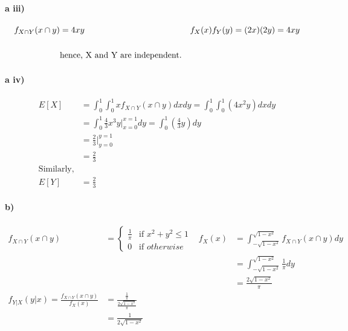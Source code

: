 \documentclass[letterpaper,12pt,titlepage,oneside,final]{book}
\begin{document}
\paragraph{a iii)}
\begin{align*}
f_{X\cap Y}(x\cap y)&=4xy &f_X(x)f_Y(y)=(2x)(2y)=4xy \\
\bigskip\\
&\text{hence, X and Y are independent.}
\end{align*}
\paragraph{a iv)}
\begin{align*}
E[X] &= \int_0^1 \int_{0}^{1}x f_{X \cap Y}(x\cap y)dxdy = \int_0^1 \int_{0}^{1}(4x^2y)dxdy\\
&= \int_0^1 \frac{4}{3} x^3y\rvert_{x=0}^{x=1}dy = \int_0^1 \left(\frac{4}{3}y\right)dy\\
&= \frac{2}{3}\rvert_{y=0}^{y=1}\\ 
&=\frac{2}{3}\\
\text{Similarly,}
\\E[Y] &=\frac{2}{3}
\end{align*}

\paragraph{b)}
\begin{align*}
f_{X\cap Y}(x\cap y)& = \begin{cases} \frac{1}{\pi} &\mbox{if } x^2 +y^2 \leq 1 \\
0 & \mbox{if } otherwise \end{cases} &f_X(x)&=\int_{-\sqrt{1-x^2}}^{\sqrt{1-x^2}} f_{X\cap Y}(x\cap y)dy\\
&&&= \int_{-\sqrt{1-x^2}}^{\sqrt{1-x^2}}\frac{1}{\pi}dy\\
&&&=\frac{2\sqrt{1-x^2}}{\pi} \\
f_{Y|X}(y|x)= \frac{f_{X\cap Y}(x\cap y)}{f_X(x)} &= \frac{\frac{1}{\pi}}{\frac{2\sqrt{1-x^2}}{\pi}}\\
&=\frac{1}{2\sqrt{1-x^2}}
\end{align*}
\end{document}
